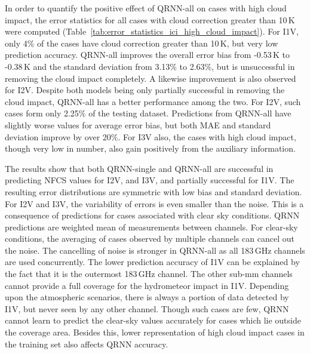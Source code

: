 \documentclass[amt, manuscript]{copernicus}
\begin{document}
In order to quantify the positive effect of QRNN-all on cases with high cloud impact, the error statistics for all cases with cloud correction greater than 10\,K were computed (Table~\ref{tab:error_statistics_ici_high_cloud_impact}). For I1V, only 4\% of the cases have cloud correction greater than 10\,K, but very low prediction accuracy. QRNN-all improves the overall error bias from -0.53\,K to -0.38\,K and the standard deviation from 3.13\% to 2.63\%, but is unsuccessful in removing the cloud impact completely. A likewise improvement is also observed for I2V. Despite both models being only partially successful in removing the cloud impact, QRNN-all has a better performance among the two. For I2V, such cases form only 2.25\% of the testing dataset. Predictions from QRNN-all have slightly worse values for average error bias, but both MAE and standard deviation improve by over 20\%. For I3V also, the cases with high cloud impact, though very low in number, also gain positively from the auxiliary information. 


The results show that both QRNN-single and QRNN-all are successful in predicting NFCS values for I2V, and I3V, and partially successful for I1V. The resulting error distributions are symmetric with low bias and standard deviation. For I2V and I3V, the variability of errors is even smaller than the noise. This is a consequence of predictions for cases associated with clear sky conditions. QRNN predictions are weighted mean of measurements between channels. For clear-sky conditions, the averaging of cases observed by multiple channels can cancel out the noise. The cancelling of noise is stronger in QRNN-all as all 183\,GHz channels are used concurrently. The lower prediction accuracy of I1V can be explained by the fact that it is the outermost 183\,GHz channel. The other sub-mm channels cannot provide a full coverage for the hydrometeor impact in I1V. Depending upon the atmospheric scenarios, there is always a portion of data detected by I1V, but never seen by any other channel. Though such cases are few, QRNN cannot learn to predict the clear-sky values accurately for cases which lie outside the coverage area. Besides this, lower representation of high cloud impact cases in the training set also affects QRNN accuracy.
 
\end{document}

